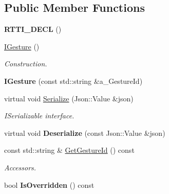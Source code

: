 \subsection*{Public Member Functions}
\begin{DoxyCompactItemize}
\item 
\mbox{\label{class_i_gesture_a6cfd84ce1368cacb8c1697f4cc0fb422}} 
{\bfseries R\+T\+T\+I\+\_\+\+D\+E\+CL} ()
\item 
\mbox{\label{class_i_gesture_a3c4ab1d83b28336b464172470450e144}} 
\hyperlink{class_i_gesture_a3c4ab1d83b28336b464172470450e144}{I\+Gesture} ()
\begin{DoxyCompactList}\small\item\em Construction. \end{DoxyCompactList}\item 
\mbox{\label{class_i_gesture_a3f4a4fa5521a8e7827acc3598139ebdd}} 
{\bfseries I\+Gesture} (const std\+::string \&a\+\_\+\+Gesture\+Id)
\item 
\mbox{\label{class_i_gesture_a41367fdda56c77bbd94be4714174f05c}} 
virtual void \hyperlink{class_i_gesture_a41367fdda56c77bbd94be4714174f05c}{Serialize} (Json\+::\+Value \&json)
\begin{DoxyCompactList}\small\item\em I\+Serializable interface. \end{DoxyCompactList}\item 
\mbox{\label{class_i_gesture_a9cb1003a5a8910fd0b616dfbfec29ca0}} 
virtual void {\bfseries Deserialize} (const Json\+::\+Value \&json)
\item 
\mbox{\label{class_i_gesture_a04abf9cb14d867ba0ce0a7bb07793e5f}} 
const std\+::string \& \hyperlink{class_i_gesture_a04abf9cb14d867ba0ce0a7bb07793e5f}{Get\+Gesture\+Id} () const
\begin{DoxyCompactList}\small\item\em Accessors. \end{DoxyCompactList}\item 
\mbox{\label{class_i_gesture_aa180fafe865c3fdeaf82258808d85017}} 
bool {\bfseries Is\+Overridden} () const

\end{DoxyCompactItemize}
